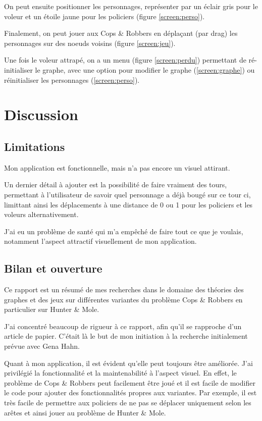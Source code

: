 \documentclass[12pt]{article}
\newcommand{\cp}{Cops \& Robbers\xspace}
\newcommand{\hm}{Hunter \& Mole\xspace}
\begin{document}
On peut ensuite positionner les personnages, représenter par un éclair gris pour le voleur et un étoile jaune pour les policiers (figure \ref{screen:perso}).

Finalement, on peut jouer aux \cp en déplaçant (par drag) les personnages sur des noeuds voisins (figure \ref{screen:jeu}).

Une fois le voleur attrapé, on a un menu (figure \ref{screen:perdu}) permettant de ré-initialiser le graphe, avec une option pour modifier le graphe (\ref{screen:graphe}) ou réinitialiser les personnages (\ref{screen:perso}).

\section{Discussion}
\subsection{Limitations}

Mon application est fonctionnelle, mais n'a pas encore un visuel attirant. 

Un dernier détail à ajouter est la possibilité de faire vraiment des tours, permettant à l'utilisateur de savoir quel personnage a déjà bougé sur ce tour ci, limittant ainsi les déplacements à une distance de 0 ou 1 pour les policiers et les voleurs alternativement.

J'ai eu un problème de santé qui m'a empêché de faire tout ce que je voulais, notamment l'aspect attractif visuellement de mon application.

\subsection{Bilan et ouverture}

Ce rapport est un résumé de mes recherches dans le domaine des théories des graphes et des jeux sur différentes variantes du problème \cp en particulier sur \hm.

J'ai concentré beaucoup de rigueur à ce rapport, afin qu'il se rapproche d'un article de papier. C'était là le but de mon initiation à la recherche initialement prévue avec Gena Hahn.

Quant à mon application, il est évident qu'elle peut toujours être améliorée. J'ai privilégié la fonctionnalité et la maintenabilité à l'aspect visuel. En effet, le problème de \cp peut facilement être joué et il est facile de modifier le code pour ajouter des fonctionnalités propres aux variantes. Par exemple, il est très facile de permettre aux policiers de ne pas se déplacer uniquement selon les arêtes et ainsi jouer au problème de \hm.





\begin{appendices}
\renewcommand\thesection{Annexe \Alph{section}}
\setcounter{secnumdepth}{1}

\end{appendices}
\end{document}

